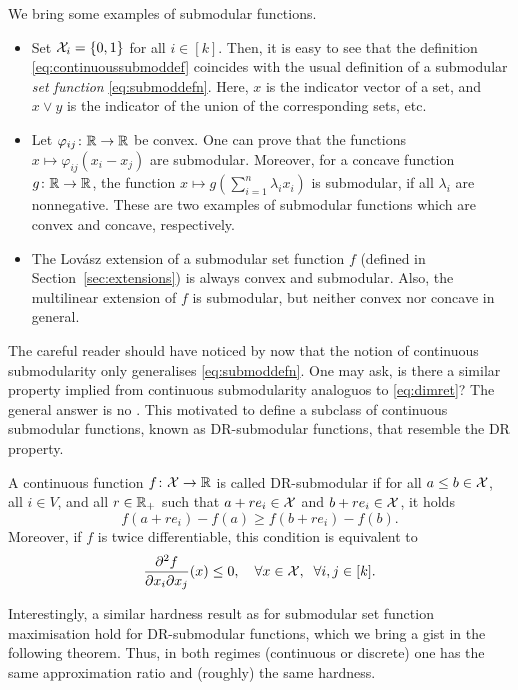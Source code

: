 We bring some examples of submodular functions.
\begin{itemize}
    \item Set $\mathcal{X}_i = \{0 ,1\}$ for all $i \in [k]$. Then, it is easy to see that the definition \eqref{eq:continuoussubmoddef} coincides with the usual definition of a submodular \emph{set function} \eqref{eq:submoddefn}. Here, $x$ is the indicator vector of a set, and $x\vee y$ is the indicator of the union of the corresponding sets, etc.

    \item Let $\varphi_{ij}\colon \mathbb{R}\to\mathbb{R}$ be convex. One can prove that the functions $x\mapsto \varphi_{ij}(x_i - x_j)$ are submodular. Moreover, for a concave function $g\colon\mathbb{R}\to\mathbb{R}$, the function $x\mapsto g(\sum_{i=1}^n \lambda_ix_i)$ is submodular, if all $\lambda_i$ are nonnegative. These are two examples of submodular functions which are convex and concave, respectively.

    \item The Lov\'asz extension of a submodular set function $f$ (defined in Section~\ref{sec:extensions}) is always convex and submodular. Also, the multilinear extension of $f$ is submodular, but neither convex nor concave in general.
\end{itemize}

The careful reader should have noticed by now that the notion of continuous submodularity only generalises \eqref{eq:submoddefn}. One may ask, is there a similar property implied from continuous submodularity analoguos to \eqref{eq:dimret}? The general answer is no \cite{soma2014optimal}. This motivated \citet{bian2016guaranteed} to define a subclass of continuous submodular functions, known as DR-submodular functions, that resemble the DR property. 

\begin{definition}\label{def:dr}
    A continuous function $f\colon \mathcal{X} \to \mathbb{R}$ is called DR-submodular if for all $a\leq b \in \mathcal{X}$, all $i\in V$, and all $r\in\mathbb{R}_+$ such that $a + re_i \in \mathcal{X}$ and $b+re_i\in\mathcal{X}$, it holds
    \[
        f(a + re_i) - f(a) \geq f(b + re_i) - f(b).
    \]
    Moreover, if $f$ is twice differentiable, this condition is equivalent to 
    \[
        \frac{\partial^2 f}{\partial x_i \partial x_j}(x) \leq 0,\quad \forall x\in\mathcal{X}, \;\;\forall i,j \in [k].
    \]
\end{definition}

Interestingly, a similar hardness result as for submodular set function maximisation hold for DR-submodular functions, which we bring a gist in the following theorem. Thus, in both regimes (continuous or discrete) one has the same approximation ratio and (roughly) the same hardness. 

